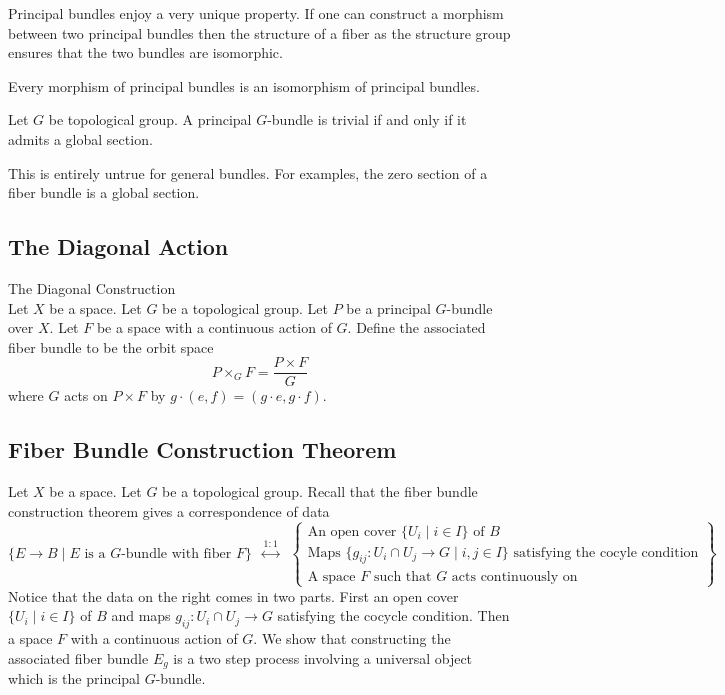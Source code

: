 \documentclass[a4paper]{article}
\begin{document}
Principal bundles enjoy a very unique property. If one can construct a morphism between two principal bundles then the structure of a fiber as the structure group ensures that the two bundles are isomorphic. 

\begin{prp}{}{} Every morphism of principal bundles is an isomorphism of principal bundles. 
\end{prp}

\begin{prp}{}{} Let $G$ be topological group. A principal $G$-bundle is trivial if and only if it admits a global section. 
\end{prp}

This is entirely untrue for general bundles. For examples, the zero section of a fiber bundle is a global section. 

\subsection{The Diagonal Action}
\begin{defn}{The Diagonal Construction}{}\\
Let $X$ be a space. Let $G$ be a topological group. Let $P$ be a principal $G$-bundle over $X$. Let $F$ be a space with a continuous action of $G$. Define the associated fiber bundle to be the orbit space $$P\times_GF=\frac{P\times F}{G}$$ where $G$ acts on $P\times F$ by $g\cdot(e,f)=(g\cdot e,g\cdot f)$. 
\end{defn}

\subsection{Fiber Bundle Construction Theorem}
Let $X$ be a space. Let $G$ be a topological group. Recall that the fiber bundle construction theorem gives a correspondence of data $$\{E\to B\;|\;E\text{ is a }G\text{-bundle with fiber }F\}\;\;\overset{1:1}{\longleftrightarrow}\;\;\left\{\substack{\text{An open cover }\{U_i\;|\;i\in I\}\text{ of }B\\\text{Maps }\{g_{ij}:U_i\cap U_j\to G\;|\;i,j\in I\}\text{ satisfying the cocyle condition}\\\text{A space }F\text{ such that }G\text{ acts continuously on}}\right\}$$ Notice that the data on the right comes in two parts. First an open cover $\{U_i\;|\;i\in I\}$ of $B$ and maps $g_{ij}:U_i\cap U_j\to G$ satisfying the cocycle condition. Then a space $F$ with a continuous action of $G$. We show that constructing the associated fiber bundle $E_g$ is a two step process involving a universal object which is the principal $G$-bundle. 
\end{document}
